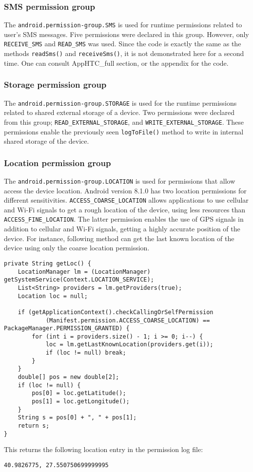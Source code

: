 \documentclass[
  a4paper,  %
  twoside,  %
  bibliography=totoc,
  headsepline,
  cleardoublepage=empty,
  parskip=half,
  draft=false,
  open=any
]{scrbook}
\begin{document}
\subsubsection{SMS permission group}
The \texttt{android.permission-group.SMS} is used for runtime permissions related to user's SMS messages. Five permissions were declared in this group. However, only \texttt{RECEIVE\_SMS} and \texttt{READ\_SMS} was used. Since the code is exactly the same as the methods \texttt{readSms()} and \texttt{receiveSms()}, it is not demonstrated here for a second time. One can consult AppHTC\_full section, or the appendix for the code.

\subsubsection{Storage permission group}
The \texttt{android.permission-group.STORAGE} is used for the runtime permissions related to shared external storage of a device. Two permissions were declared from this group; \texttt{READ\_EXTERNAL\_STORAGE}, and \texttt{WRITE\_EXTERNAL\_STORAGE}. These permissions enable the previously seen \texttt{logToFile()} method to write in internal shared storage of the device. 

\subsubsection{Location permission group}
The \texttt{android.permission-group.LOCATION} is used for permissions that allow access the device location. Android version 8.1.0 has two location permissions for different sensitivities. \texttt{ACCESS\_COARSE\_LOCATION} allows applications to use cellular and Wi-Fi signals to get a rough location of the device, using less resources than \texttt{ACCESS\_FINE\_LOCATION}. The latter permission enables the use of GPS signals in addition to cellular and Wi-Fi signals, getting a highly accurate position of the device. For instance, following method can get the last known location of the device using only the coarse location permission.
\begin{lstlisting}
private String getLoc() {
	LocationManager lm = (LocationManager) getSystemService(Context.LOCATION_SERVICE);
	List<String> providers = lm.getProviders(true);
	Location loc = null;
	
	if (getApplicationContext().checkCallingOrSelfPermission
			(Manifest.permission.ACCESS_COARSE_LOCATION) == PackageManager.PERMISSION_GRANTED) {
		for (int i = providers.size() - 1; i >= 0; i--) {
			loc = lm.getLastKnownLocation(providers.get(i));
			if (loc != null) break;
		}
	}
	double[] pos = new double[2];
	if (loc != null) {
		pos[0] = loc.getLatitude();
		pos[1] = loc.getLongitude();
	}
	String s = pos[0] + ", " + pos[1];
	return s;
}
\end{lstlisting}
This returns the following location entry in the permission log file:
\begin{lstlisting}
40.9826775, 27.550750699999995
\end{lstlisting}
\end{document}
